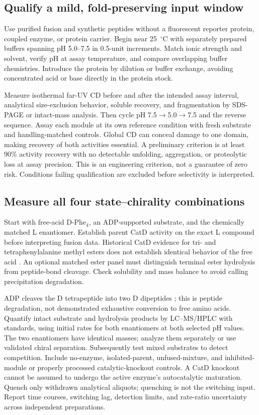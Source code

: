 \documentclass{article}
\begin{document}
\subsection{Qualify a mild, fold-preserving input window}
Use purified fusion and synthetic peptides without a fluorescent reporter
protein, coupled enzyme, or protein carrier. Begin near 25~$^\circ$C with
separately prepared buffers spanning pH 5.0--7.5 in 0.5-unit increments.
Match ionic strength and solvent, verify pH at assay temperature, and compare
overlapping buffer chemistries. Introduce the protein by dilution or buffer
exchange, avoiding concentrated acid or base directly in the protein stock.

Measure isothermal far-UV CD before and after the intended assay interval,
analytical size-exclusion behavior, soluble recovery, and fragmentation by
SDS-PAGE or intact-mass analysis. Then cycle pH 7.5$\to$5.0$\to$7.5 and the
reverse sequence. Assay each module at its own reference condition with fresh
substrate and handling-matched controls. Global CD can conceal damage to one
domain, making recovery of both activities essential. A preliminary criterion
is at least 90\% activity recovery with no detectable unfolding, aggregation,
or proteolytic loss at assay precision. This is an engineering criterion,
not a guarantee of zero risk. Conditions failing qualification are excluded
before selectivity is interpreted.

\subsection{Measure all four state--chirality combinations}
Start with free-acid D-Phe$_4$, an ADP-supported substrate, and the chemically
matched L enantiomer. Establish parent CatD activity on the exact L compound
before interpreting fusion data. Historical CatD evidence for tri- and
tetraphenylalanine methyl esters does not establish identical behavior of the
free acid \citep{keilova1968}. An optional matched ester panel must distinguish
terminal ester hydrolysis from peptide-bond cleavage. Check solubility and
mass balance to avoid calling precipitation degradation.

ADP cleaves the D tetrapeptide into two D dipeptides \citep{nakano2015};
this is peptide degradation, not demonstrated exhaustive conversion to free
amino acids. Quantify intact substrate and hydrolysis products by LC--MS/HPLC with standards,
using initial rates for both enantiomers at both selected pH values. The two
enantiomers have identical masses; analyze them separately or use validated
chiral separation. Subsequently test mixed substrates to detect competition.
Include no-enzyme, isolated-parent, unfused-mixture, and inhibited-module or
properly processed catalytic-knockout controls. A CatD knockout cannot be
assumed to undergo the active enzyme's autocatalytic maturation. Quench only
withdrawn analytical aliquots; quenching is not the
switching input. Report time courses, switching lag, detection limits, and
rate-ratio uncertainty across independent preparations.
\end{document}
